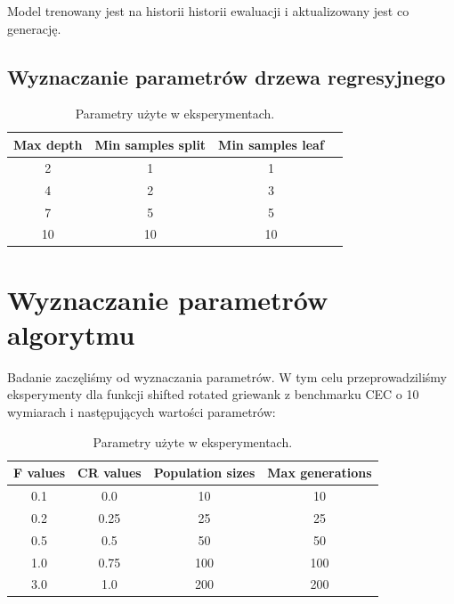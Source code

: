 \documentclass{article}
\begin{document}
Model trenowany jest na historii historii ewaluacji i aktualizowany jest co generację.

\subsection{Wyznaczanie parametrów drzewa regresyjnego}

\begin{table}[h!]
    \centering
    \begin{tabular}{|c|c|c|c|}
    \hline
    \textbf{Max depth}  & \textbf{Min samples split}    & \textbf{Min samples leaf} \\ \hline
    2                   & 1                             & 1                         \\ \hline
    4                   & 2                             & 3                         \\ \hline
    7                   & 5                             & 5                         \\ \hline
    10                  & 10                            & 10                        \\ \hline
    \end{tabular}
    \caption{Parametry użyte w eksperymentach.}
    \label{tab:tr_parameters}
\end{table}



\section{Wyznaczanie parametrów algorytmu}

Badanie zaczęliśmy od wyznaczania parametrów. W tym celu przeprowadziliśmy eksperymenty dla funkcji shifted rotated griewank z benchmarku CEC o 10 wymiarach i następujących wartości parametrów:

\begin{table}[h!]
    \centering
    \begin{tabular}{|c|c|c|c|}
    \hline
    \textbf{F values}   & \textbf{CR values}    & \textbf{Population sizes} & \textbf{Max generations}  \\ \hline
    0.1                 & 0.0                   & 10                        & 10                        \\ \hline
    0.2                 & 0.25                  & 25                        & 25                        \\ \hline
    0.5                 & 0.5                   & 50                        & 50                        \\ \hline
    1.0                 & 0.75                  & 100                       & 100                       \\ \hline
    3.0                 & 1.0                   & 200                       & 200                       \\ \hline
    \end{tabular}
    \caption{Parametry użyte w eksperymentach.}
    \label{tab:de_parameters}
\end{table}
\end{document}
